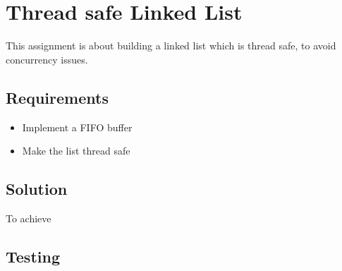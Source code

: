 \chapter{Thread safe Linked List}
This assignment is about building a linked list which is thread safe, to avoid concurrency issues.

\section{Requirements}
\begin{itemize}
\item Implement a FIFO buffer
\item Make the list thread safe
\end{itemize}

\section{Solution}
To achieve 

\section{Testing}
